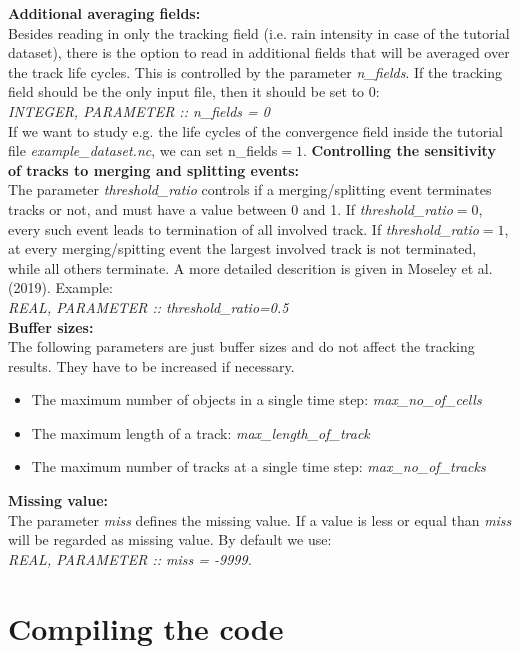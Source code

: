 \documentclass[11pt]{article}
\begin{document}
{\bf Additional averaging fields:}\\
Besides reading in only the tracking field (i.e. rain intensity in case of the tutorial dataset), there is the option to read in additional fields that will be averaged over the track life cycles. This is controlled by the parameter {\it n\_fields}. If the tracking field should be the only input file, then it should be set to 0:\\
{\it INTEGER, PARAMETER    ::  n\_fields = 0} \\
If we want to study e.g. the life cycles of the convergence field inside the  tutorial file {\it example\_dataset.nc}, we can set {n\_fields}$=1$.
{\bf Controlling the sensitivity of tracks to merging and splitting events:}\\
The parameter {\it threshold\_ratio} controls if a merging/splitting event terminates tracks or not, and must have a value between 0 and 1. If {\it threshold\_ratio}$=0$, every such event leads to termination of all involved track. If {\it threshold\_ratio}$=1$, at every merging/spitting event the largest involved track is not terminated, while all others terminate. A more detailed descrition is given in Moseley {et al.} (2019). Example:\\
{\it REAL, PARAMETER       :: threshold\_ratio=0.5}\vspace{0.5cm} \\
{\bf Buffer sizes:}\\
The following parameters are just buffer sizes and do not affect the tracking results. They have to be increased if necessary.
\begin{itemize}
\item The maximum number of objects in a single time step: {\it max\_no\_of\_cells}
\item The maximum length of a track: {\it max\_length\_of\_track}
\item The maximum number of tracks at a single time step: {\it max\_no\_of\_tracks}
\end{itemize}\vspace{0.5cm}
{\bf Missing value:}\\
The parameter {\it miss} defines the missing value. If a value is less or equal than {\it miss} will be regarded as missing value. By default we use:\\
{\it REAL, PARAMETER       :: miss = -9999.}

\section{Compiling the code}\label{sec_compile}
\end{document}
